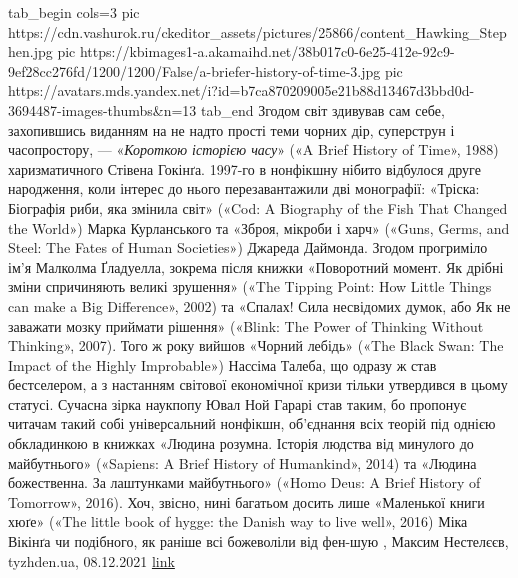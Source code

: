 \ifcmt
  tab_begin cols=3
     pic https://cdn.vashurok.ru/ckeditor_assets/pictures/25866/content_Hawking_Stephen.jpg
     pic https://kbimages1-a.akamaihd.net/38b017c0-6e25-412e-92c9-9ef28cc276fd/1200/1200/False/a-briefer-history-of-time-3.jpg
		 pic https://avatars.mds.yandex.net/i?id=b7ca870209005e21b88d13467d3bbd0d-3694487-images-thumbs&n=13
  tab_end
\fi
Згодом світ здивував сам себе, захопившись виданням на не надто прості теми
чорних дір, суперструн і часопростору, — «\emph{Короткою історією часу}» («A Brief
History of Time», 1988) харизматичного Стівена Гокінґа. 1997-го в нонфікшну
нібито відбулося друге народження, коли інтерес до нього перезавантажили дві
монографії: «Тріска: Біографія риби, яка змінила світ» («Cod: A Biography of
the Fish That Changed the World») Марка Курланського та «Зброя, мікроби і харч»
(«Guns, Germs, and Steel: The Fates of Human Societies») Джареда Даймонда.
Згодом прогриміло ім’я Малколма Ґладуелла, зокрема після книжки «Поворотний
момент. Як дрібні зміни спричиняють великі зрушення» («The Tipping Point: How
Little Things can make a Big Difference», 2002) та «Спалах! Сила несвідомих
думок, або Як не заважати мозку приймати рішення» («Blink: The Power of
Thinking Without Thinking», 2007). Того ж року вийшов «Чорний лебідь» («The
Black Swan: The Impact of the Highly Improbable») Нассіма Талеба, що одразу ж
став бестселером, а з настанням світової економічної кризи тільки утвердився в
цьому статусі. Сучасна зірка наукпопу Ювал Ной Гарарі став таким, бо пропонує
читачам такий собі універсальний нонфікшн, об’єднання всіх теорій під однією
обкладинкою в книжках «Людина розумна. Історія людства від минулого до
майбутнього» («Sapiens: A Brief History of Humankind», 2014) та «Людина
божественна. За лаштунками майбутнього» («Homo Deus: A Brief History of
Tomorrow», 2016). Хоч, звісно, нині багатьом досить лише «Маленької книги хюґе»
(«The little book of hygge: the Danish way to live well», 2016) Міка Вікінґа чи
подібного, як раніше всі божеволіли від фен-шую
, Максим Нестелєєв, tyzhden.ua, 08.12.2021%
\href{https://tyzhden.ua/Columns/50/253787}{link}
